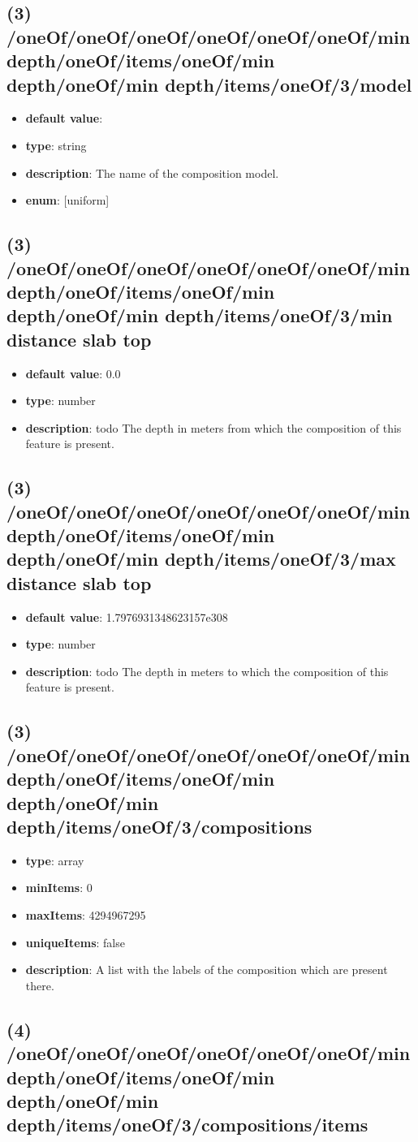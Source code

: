 \subsection{(3) /oneOf/oneOf/oneOf/oneOf/oneOf/oneOf/min depth/oneOf/items/oneOf/min depth/oneOf/min depth/items/oneOf/3/model}
\begin{itemize}[leftmargin=3em]\item {\bf default value}: 
\item {\bf type}: string
\item {\bf description}: The name of the composition model.
\item {\bf enum}: [uniform]\end{itemize}\subsection{(3) /oneOf/oneOf/oneOf/oneOf/oneOf/oneOf/min depth/oneOf/items/oneOf/min depth/oneOf/min depth/items/oneOf/3/min distance slab top}
\begin{itemize}[leftmargin=3em]\item {\bf default value}: 0.0
\item {\bf type}: number
\item {\bf description}: todo The depth in meters from which the composition of this feature is present.
\end{itemize}\subsection{(3) /oneOf/oneOf/oneOf/oneOf/oneOf/oneOf/min depth/oneOf/items/oneOf/min depth/oneOf/min depth/items/oneOf/3/max distance slab top}
\begin{itemize}[leftmargin=3em]\item {\bf default value}: 1.7976931348623157e308
\item {\bf type}: number
\item {\bf description}: todo The depth in meters to which the composition of this feature is present.
\end{itemize}\subsection{(3) /oneOf/oneOf/oneOf/oneOf/oneOf/oneOf/min depth/oneOf/items/oneOf/min depth/oneOf/min depth/items/oneOf/3/compositions}
\begin{itemize}[leftmargin=3em]\item {\bf type}: array
\item {\bf minItems}: 0
\item {\bf maxItems}: 4294967295
\item {\bf uniqueItems}: false
\item {\bf description}: A list with the labels of the composition which are present there.
\end{itemize}\subsection{(4) /oneOf/oneOf/oneOf/oneOf/oneOf/oneOf/min depth/oneOf/items/oneOf/min depth/oneOf/min depth/items/oneOf/3/compositions/items}
